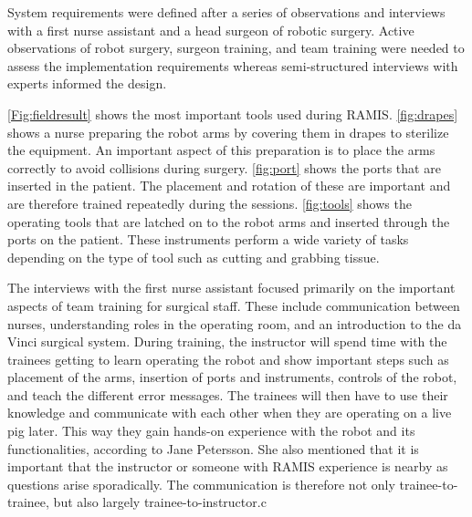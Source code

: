 \documentclass[conference]{IEEEtran}
\begin{document}
System requirements were defined after a series of observations and interviews with a first nurse assistant and a head surgeon of robotic surgery. Active observations of robot surgery, surgeon training, and team training were needed to assess the implementation requirements whereas semi-structured interviews with experts informed the design. 

\autoref{Fig:fieldresult} shows the most important tools used during RAMIS. \autoref{fig:drapes} shows a nurse preparing the robot arms by covering them in drapes to sterilize the equipment. An important aspect of this preparation is to place the arms correctly to avoid collisions during surgery. \autoref{fig:port} shows the ports that are inserted in the patient. The placement and rotation of these are important and are therefore trained repeatedly during the sessions. \autoref{fig:tools} shows the operating tools that are latched on to the robot arms and inserted through the ports on the patient. These instruments perform a wide variety of tasks depending on the type of tool such as cutting and grabbing tissue.


The interviews with the first nurse assistant focused primarily on the important aspects of team training for surgical staff. These include communication between nurses, understanding roles in the operating room, and an introduction to the da Vinci surgical system. During training, the instructor will spend time with the trainees getting to learn operating the robot and show important steps such as placement of the arms, insertion of ports and instruments, controls of the robot, and teach the different error messages. The trainees will then have to use their knowledge and communicate with each other when they are operating on a live pig later. This way they gain hands-on experience with the robot and its functionalities, according to Jane Petersson. She also mentioned that it is important that the instructor or someone with RAMIS experience is nearby as questions arise sporadically. The communication is therefore not only trainee-to-trainee, but also largely trainee-to-instructor.c
\end{document}

